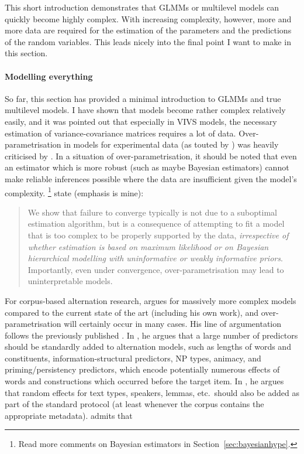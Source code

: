 This short introduction demonstrates that GLMMs or multilevel models can quickly become highly complex.
With increasing complexity, however, more and more data are required for the estimation of the parameters and the predictions of the random variables.
This leads nicely into the final point I want to make in this section.

\paragraph{Modelling everything}

So far, this section has provided a minimal introduction to GLMMs and true multilevel models.
I have shown that models become rather complex relatively easily, and it was pointed out that especially in VIVS models, the necessary estimation of variance-covariance matrices requires a lot of data.
Over-parametrisation in models for experimental data (as touted by \citealt{BarrEa2013}) was heavily criticised by \citet{BatesEa2015a,MatuschekEa2017}.
In a situation of over-parametrisation, it should be noted that even an estimator which is more robust (such as maybe Bayesian estimators) cannot make reliable inferences possible where the data are insufficient given the model's complexity.%
\footnote{Read more comments on Bayesian estimators in Section~\ref{sec:bayesianhype}.}
\citet[1]{BatesEa2015a} state (emphasis is mine): 

\begin{quote}
  We show that failure to converge typically is not due to a suboptimal estimation algorithm, but is a consequence of attempting to fit a model that is too complex to be properly supported by the data, \textit{irrespective of whether estimation is based on maximum likelihood or on Bayesian hierarchical modelling with uninformative or weakly informative priors}.
  Importantly, even under convergence, over-parametrisation may lead to uninterpretable models.
\end{quote}

For corpus-based alternation research, \citet{Gries2017a} argues for massively more complex models compared to the current state of the art (including his own work), and over-parametrisation will certainly occur in many cases.
His line of argumentation follows the previously published \citet{Gries2015}.
In \citet[21--24]{Gries2017a}, he argues that a large number of predictors should be standardly added to alternation models, such as lengths of words and constituents, information-structural predictors, NP types, animacy, and priming\slash persistency predictors, which encode potentially numerous effects of words and constructions which occurred before the target item.
In \citet{Gries2015}, he argues that random effects for text types, speakers, lemmas, etc.\ should also be added as part of the standard protocol (at least whenever the corpus contains the appropriate metadata).
\citet[24]{Gries2017a} admits that

